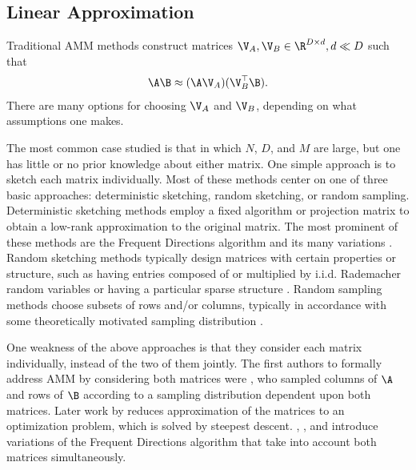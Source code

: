 
\subsection{Linear Approximation}

Traditional AMM methods construct matrices $\V_A, \V_B \in \R^{D \times d}, d \ll D$ such that
\begin{align}
    \A \B \approx (\A \V_A) (\V_B^\top \B).
\end{align}
There are many options for choosing $\V_A$ and $\V_B$, depending on what assumptions one makes.

The most common case studied is that in which $N$, $D$, and $M$ are large, but one has little or no prior knowledge about either matrix. One simple approach is to sketch each matrix individually. Most of these methods center on one of three basic approaches: deterministic sketching, random sketching, or random sampling. Deterministic sketching methods employ a fixed algorithm or projection matrix to obtain a low-rank approximation to the original matrix. The most prominent of these methods are the Frequent Directions algorithm \cite{liberty_simple_2012, ghashami_frequent_2016} and its many variations \cite{teng_fast_2019, francis_practical_2018, ye_frequent_2016, huang_near_2019, luo_robust_2019, francis_improvement_2018}. Random sketching methods typically design matrices with certain properties or structure, such as having entries composed of or multiplied by i.i.d. Rademacher random variables \cite{sarlos_improved_2006, kyrillidis_approximate_2014, pagh_compressed_2013} or having a particular sparse structure \cite{hashjl,osnap}. Random sampling methods choose subsets of rows and/or columns, typically in accordance with some theoretically motivated sampling distribution \cite{drineas_fast_2006-1, drineas_fast_2006-2}.

One weakness of the above approaches is that they consider each matrix individually, instead of the two of them jointly. The first authors to formally address AMM by considering both matrices were \citet{drineas_fast_2006}, who sampled columns of $\A$ and rows of $\B$ according to a sampling distribution dependent upon both matrices. Later work by \citet{manne_fast_2014} reduces approximation of the matrices to an optimization problem, which is solved by steepest descent. \citet{mroueh_co-occuring_2016}, \citet{ye_frequent_2016}, and \citet{francis_improvement_2018} introduce variations of the Frequent Directions algorithm that take into account both matrices simultaneously.

